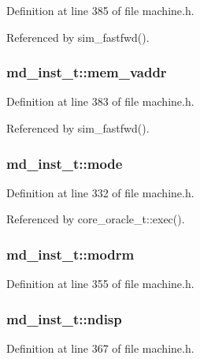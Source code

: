Definition at line 385 of file machine.h.

Referenced by sim\_\-fastfwd().
\subsubsection[{mem\_\-vaddr}]{ {\bf md\_\-inst\_\-t::mem\_\-vaddr}}\label{structmd__inst__t_b5f64c5560af0a48098e149f107890d6}




Definition at line 383 of file machine.h.

Referenced by sim\_\-fastfwd().
\subsubsection[{mode}]{ {\bf md\_\-inst\_\-t::mode}}\label{structmd__inst__t_0b5a8c4597c2e37cf890118bd975f552}




Definition at line 332 of file machine.h.

Referenced by core\_\-oracle\_\-t::exec().
\subsubsection[{modrm}]{ {\bf md\_\-inst\_\-t::modrm}}\label{structmd__inst__t_f6202dfa18a0a666f44e72577e9a8a3d}




Definition at line 355 of file machine.h.
\subsubsection[{ndisp}]{ {\bf md\_\-inst\_\-t::ndisp}}\label{structmd__inst__t_0e721f5757e02c128eb15e51e1f37e99}




Definition at line 367 of file machine.h.
